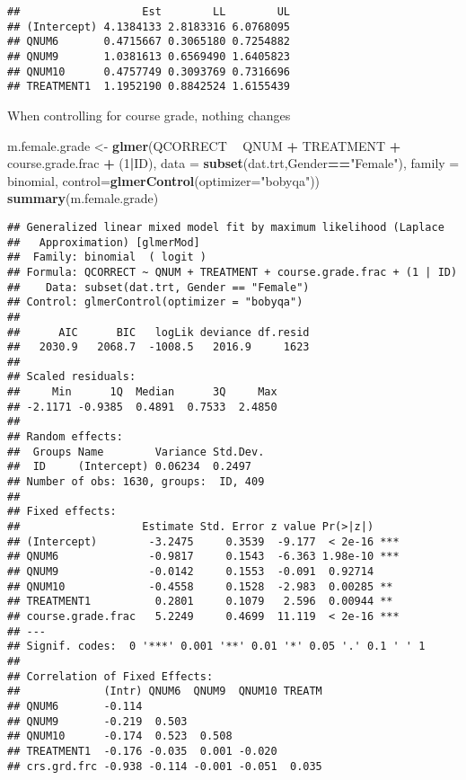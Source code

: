 \documentclass[]{article}
\newenvironment{Shaded}{\begin{snugshade}}{\end{snugshade}}
\newcommand{\KeywordTok}[1]{\textcolor[rgb]{0.13,0.29,0.53}{\textbf{#1}}}
\newcommand{\DataTypeTok}[1]{\textcolor[rgb]{0.13,0.29,0.53}{#1}}
\newcommand{\DecValTok}[1]{\textcolor[rgb]{0.00,0.00,0.81}{#1}}
\newcommand{\StringTok}[1]{\textcolor[rgb]{0.31,0.60,0.02}{#1}}
\newcommand{\OperatorTok}[1]{\textcolor[rgb]{0.81,0.36,0.00}{\textbf{#1}}}
\newcommand{\NormalTok}[1]{#1}
\begin{document}
\begin{verbatim}
##                   Est        LL        UL
## (Intercept) 4.1384133 2.8183316 6.0768095
## QNUM6       0.4715667 0.3065180 0.7254882
## QNUM9       1.0381613 0.6569490 1.6405823
## QNUM10      0.4757749 0.3093769 0.7316696
## TREATMENT1  1.1952190 0.8842524 1.6155439
\end{verbatim}

When controlling for course grade, nothing changes

\begin{Shaded}
\begin{Highlighting}[]
\NormalTok{m.female.grade <-}\StringTok{ }\KeywordTok{glmer}\NormalTok{(QCORRECT }\OperatorTok{~}\StringTok{ }\NormalTok{QNUM }\OperatorTok{+}\StringTok{ }\NormalTok{TREATMENT }\OperatorTok{+}\StringTok{ }\NormalTok{course.grade.frac }\OperatorTok{+}\StringTok{ }\NormalTok{(}\DecValTok{1}\OperatorTok{|}\NormalTok{ID), }
                \DataTypeTok{data =} \KeywordTok{subset}\NormalTok{(dat.trt,Gender}\OperatorTok{==}\StringTok{"Female"}\NormalTok{), }
                \DataTypeTok{family =}\NormalTok{ binomial, }\DataTypeTok{control=}\KeywordTok{glmerControl}\NormalTok{(}\DataTypeTok{optimizer=}\StringTok{"bobyqa"}\NormalTok{))}
\KeywordTok{summary}\NormalTok{(m.female.grade)}
\end{Highlighting}
\end{Shaded}

\begin{verbatim}
## Generalized linear mixed model fit by maximum likelihood (Laplace
##   Approximation) [glmerMod]
##  Family: binomial  ( logit )
## Formula: QCORRECT ~ QNUM + TREATMENT + course.grade.frac + (1 | ID)
##    Data: subset(dat.trt, Gender == "Female")
## Control: glmerControl(optimizer = "bobyqa")
## 
##      AIC      BIC   logLik deviance df.resid 
##   2030.9   2068.7  -1008.5   2016.9     1623 
## 
## Scaled residuals: 
##     Min      1Q  Median      3Q     Max 
## -2.1171 -0.9385  0.4891  0.7533  2.4850 
## 
## Random effects:
##  Groups Name        Variance Std.Dev.
##  ID     (Intercept) 0.06234  0.2497  
## Number of obs: 1630, groups:  ID, 409
## 
## Fixed effects:
##                   Estimate Std. Error z value Pr(>|z|)    
## (Intercept)        -3.2475     0.3539  -9.177  < 2e-16 ***
## QNUM6              -0.9817     0.1543  -6.363 1.98e-10 ***
## QNUM9              -0.0142     0.1553  -0.091  0.92714    
## QNUM10             -0.4558     0.1528  -2.983  0.00285 ** 
## TREATMENT1          0.2801     0.1079   2.596  0.00944 ** 
## course.grade.frac   5.2249     0.4699  11.119  < 2e-16 ***
## ---
## Signif. codes:  0 '***' 0.001 '**' 0.01 '*' 0.05 '.' 0.1 ' ' 1
## 
## Correlation of Fixed Effects:
##             (Intr) QNUM6  QNUM9  QNUM10 TREATM
## QNUM6       -0.114                            
## QNUM9       -0.219  0.503                     
## QNUM10      -0.174  0.523  0.508              
## TREATMENT1  -0.176 -0.035  0.001 -0.020       
## crs.grd.frc -0.938 -0.114 -0.001 -0.051  0.035
\end{verbatim}
\end{document}

